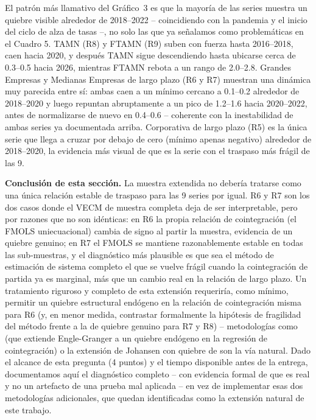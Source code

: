 \documentclass[12pt, letterpaper]{article}
\begin{document}
El patrón más llamativo del Gráfico~3 es que la mayoría de las series
muestra un quiebre visible alrededor de 2018--2022 -- coincidiendo con
la pandemia y el inicio del ciclo de alza de tasas --, no solo las que
ya señalamos como problemáticas en el Cuadro 5. TAMN (R8) y FTAMN (R9)
suben con fuerza hasta 2016--2018, caen hacia 2020, y después TAMN
sigue descendiendo hasta ubicarse cerca de 0.3--0.5 hacia 2026,
mientras FTAMN rebota a un rango de 2.0--2.8. Grandes Empresas y
Medianas Empresas de largo plazo (R6 y R7) muestran una dinámica muy
parecida entre sí: ambas caen a un mínimo cercano a 0.1--0.2 alrededor
de 2018--2020 y luego repuntan abruptamente a un pico de 1.2--1.6 hacia
2020--2022, antes de normalizarse de nuevo en 0.4--0.6 -- coherente con
la inestabilidad de ambas series ya documentada arriba. Corporativa de
largo plazo (R5) es la única serie que llega a cruzar por debajo de
cero (mínimo apenas negativo) alrededor de 2018--2020, la evidencia
más visual de que es la serie con el traspaso más frágil de las 9.

\textbf{Conclusión de esta sección.} La muestra extendida no debería
tratarse como una única relación estable de traspaso para las 9
series por igual. R6 y R7 son los dos casos donde el VECM de muestra
completa deja de ser interpretable, pero por razones que no son
idénticas: en R6 la propia relación de cointegración (el FMOLS
uniecuacional) cambia de signo al partir la muestra, evidencia de un
quiebre genuino; en R7 el FMOLS se mantiene razonablemente estable en
todas las sub-muestras, y el diagnóstico más plausible es que sea el
método de estimación de sistema completo el que se vuelve frágil
cuando la cointegración de partida ya es marginal, más que un cambio
real en la relación de largo plazo. Un tratamiento riguroso y completo
de esta extensión requeriría, como mínimo, permitir un quiebre
estructural endógeno en la relación de cointegración misma para R6 (y,
en menor medida, contrastar formalmente la hipótesis de fragilidad del
método frente a la de quiebre genuino para R7 y R8) --
metodologías como \textcite{gregoryhansen1996} (que extiende
Engle-Granger a un quiebre endógeno en la regresión de cointegración)
o la extensión de Johansen con quiebre de \textcite{johansenmosconinielsen2000}
son la vía natural. Dado el alcance de esta pregunta (4 puntos) y el
tiempo disponible antes de la entrega, documentamos aquí el
diagnóstico completo -- con evidencia formal de que es real y no un
artefacto de una prueba mal aplicada -- en vez de implementar esas dos
metodologías adicionales, que quedan identificadas como la extensión
natural de este trabajo.
\end{document}
